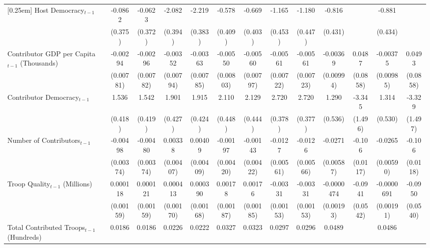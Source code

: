 \begin{table}[htbp]
\begin{tabular}{l*{12}{c}}
[0.25em]
Host Democracy$_{t-1}$ & -0.0862 & -0.0623 & -2.082\sym{**}& -2.219\sym{**}& -0.578 & -0.669\sym{\dagger} & -1.165\sym{*} & -1.180\sym{**} & -0.816\sym{\dagger} & & -0.881\sym{*} & \\
                       & (0.375) & (0.372) & (0.394)       & (0.383)       & (0.409)& (0.403)             & (0.453)       & (0.447)        & (0.431)             & & (0.434)       &  \\
[0.25em]
Contributor GDP per Capita$_{t-1}$ (Thousands)& -0.00294 & -0.00296 & -0.00352 & -0.00363 & -0.00550 & -0.00560 & -0.00561 & -0.00561 &  -0.00369 & 0.0487  & -0.00375 & 0.0493  \\
                                              & (0.00781)& (0.00782)& (0.00794)& (0.00785)& (0.00803)& (0.00797)& (0.00722)& (0.00723)& (0.00994) & (0.0858)& (0.00985)& (0.0858)\\
[0.25em]
Contributor Democracy$_{t-1}$& 1.536\sym{**}& 1.542\sym{**}& 1.901\sym{**}& 1.915\sym{**}& 2.110\sym{**}& 2.129\sym{**}& 2.720\sym{**}& 2.720\sym{**} & 1.290\sym{*} &  -3.345\sym{*} & 1.314\sym{*} & -3.329\sym{*}\\
                             & (0.418)      & (0.419)      & (0.427)      & (0.424)      & (0.448)      & (0.444)      & (0.378)      & (0.377)       & (0.536)      &  (1.496)       & (0.530)      & (1.497)\\
[0.25em]
Number of Contributors$_{t-1}$& -0.00498 & -0.00480 & 0.00338  & 0.00409  & -0.00197 & -0.00143 & -0.0127\sym{*} & -0.0126\sym{*} & -0.0271\sym{**} & -0.106\sym{**} & -0.0265\sym{**} & -0.106\sym{**} \\
                              & (0.00374)& (0.00374)& (0.00407)& (0.00409)& (0.00420)& (0.00422)& (0.00561)      & (0.00566)      & (0.00587)       & (0.0117)       & (0.00590)       & (0.0118) \\
[0.25em]
Troop Quality$_{t-1}$ (Millions)& 0.000118 & 0.000121 & 0.000413 & 0.000390 & 0.00178  & 0.00176  & -0.00331\sym{*} & -0.00331\sym{*} & -0.0000474 & -0.0941\sym{\dagger} & -0.0000691 & -0.0950\sym{\dagger} \\
                                & (0.00159)& (0.00159)& (0.00170)& (0.00168)& (0.00187)& (0.00185)& (0.00153)       & (0.00153)       & (0.00193)  & (0.0542)             &   (0.00191)& (0.0540) \\
[0.25em]
Total Contributed Troops$_{t-1}$ (Hundreds)& 0.0186\sym{**}& 0.0186\sym{**}& 0.0226\sym{**}& 0.0222\sym{**}& 0.0327\sym{**}& 0.0323\sym{**}& 0.0297\sym{**}& 0.0296\sym{**} & 0.0489\sym{**} & & 0.0486\sym{**} & \\

\end{tabular}
\end{table}
